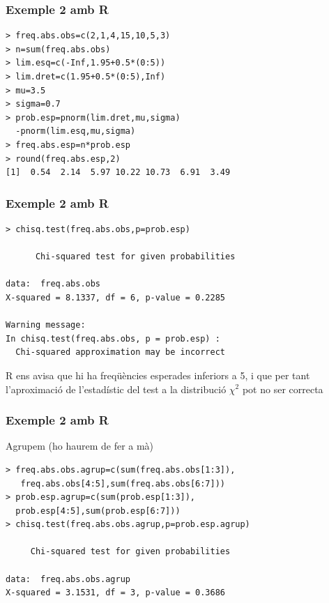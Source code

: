 \documentclass[12pt,t]{beamer}
\theoremstyle{plain}
\theoremstyle{definition}
\begin{document}
\begin{frame}[fragile]
\frametitle{Exemple 2 amb R}
\vspace*{-3ex}

\begin{verbatim}
> freq.abs.obs=c(2,1,4,15,10,5,3)
> n=sum(freq.abs.obs)
> lim.esq=c(-Inf,1.95+0.5*(0:5))
> lim.dret=c(1.95+0.5*(0:5),Inf)
> mu=3.5
> sigma=0.7
> prob.esp=pnorm(lim.dret,mu,sigma)
  -pnorm(lim.esq,mu,sigma)
> freq.abs.esp=n*prob.esp
> round(freq.abs.esp,2)
[1]  0.54  2.14  5.97 10.22 10.73  6.91  3.49
\end{verbatim}
\end{frame}

\begin{frame}[fragile]
\frametitle{Exemple 2 amb R}
\vspace*{-3ex}

\begin{verbatim}
> chisq.test(freq.abs.obs,p=prob.esp)
      
      Chi-squared test for given probabilities

data:  freq.abs.obs 
X-squared = 8.1337, df = 6, p-value = 0.2285

Warning message:
In chisq.test(freq.abs.obs, p = prob.esp) :
  Chi-squared approximation may be incorrect
\end{verbatim}
\medskip

R ens avisa que hi ha freqüències esperades inferiors a 5, i que per tant  l'aproximació
de l'estadístic del test a la distribució $\chi^2$ pot no ser correcta
\end{frame}

\begin{frame}[fragile]
\frametitle{Exemple 2 amb R}

Agrupem (ho haurem de fer a mà)

{\small 
\begin{verbatim}
> freq.abs.obs.agrup=c(sum(freq.abs.obs[1:3]),
   freq.abs.obs[4:5],sum(freq.abs.obs[6:7]))
> prob.esp.agrup=c(sum(prob.esp[1:3]),
  prob.esp[4:5],sum(prob.esp[6:7]))
> chisq.test(freq.abs.obs.agrup,p=prob.esp.agrup)
     
     Chi-squared test for given probabilities

data:  freq.abs.obs.agrup 
X-squared = 3.1531, df = 3, p-value = 0.3686
\end{verbatim}
}

\end{frame}

\end{document}
